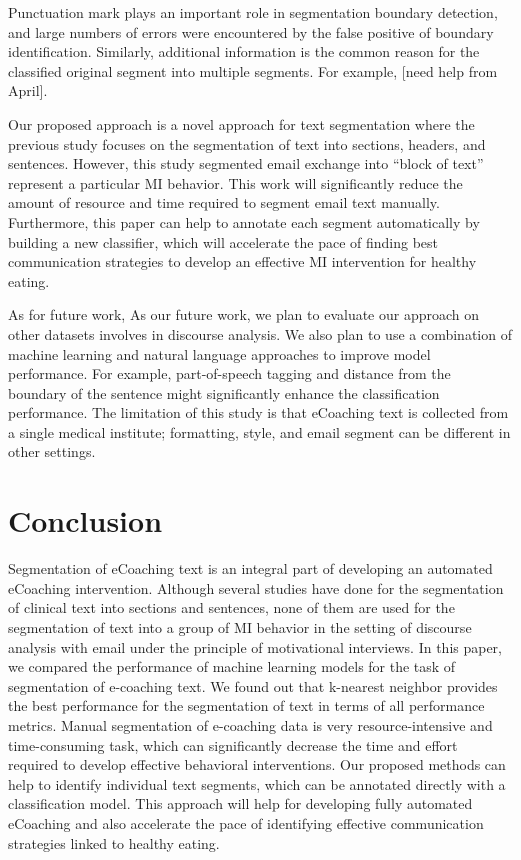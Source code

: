 \documentclass{amia}
\begin{document}
Punctuation mark plays an important role in segmentation boundary detection, and large numbers of errors were encountered by the false positive of boundary identification. Similarly, additional information is the common reason for the classified original segment into multiple segments. For example, [need help from April].

Our proposed approach is a novel approach for text segmentation where the previous study focuses on the segmentation of text into sections, headers, and sentences. However, this study segmented email exchange into ``block of text'' represent a particular MI behavior. This work will significantly reduce the amount of resource and time required to segment email text manually. Furthermore, this paper can help to annotate each segment automatically by building a new classifier, which will accelerate the pace of finding best communication strategies to develop an effective MI intervention for healthy eating.

As for future work, As our future work, we plan to evaluate our approach on other datasets involves in discourse analysis. We also plan to use a combination of machine learning and natural language approaches to improve model performance. For example, part-of-speech tagging and distance from the boundary of the sentence might significantly enhance the classification performance. The limitation of this study is that eCoaching text is collected from a single medical institute; formatting, style, and email segment can be different in other settings.
 
\section*{Conclusion}
Segmentation of eCoaching text is an integral part of developing an automated eCoaching intervention. Although several studies have done for the segmentation of clinical text into sections and sentences, none of them are used for the segmentation of text into a group of MI behavior in the setting of discourse analysis with email under the principle of motivational interviews. In this paper, we compared the performance of machine learning models for the task of segmentation of e-coaching text. We found out that k-nearest neighbor provides the best performance for the segmentation of text in terms of all performance metrics. Manual segmentation of e-coaching data is very resource-intensive and time-consuming task, which can significantly decrease the time and effort required to develop effective behavioral interventions. Our proposed methods can help to identify individual text segments, which can be annotated directly with a classification model. This approach will help for developing fully automated eCoaching and also accelerate the pace of identifying effective communication strategies linked to healthy eating.
\end{document}
